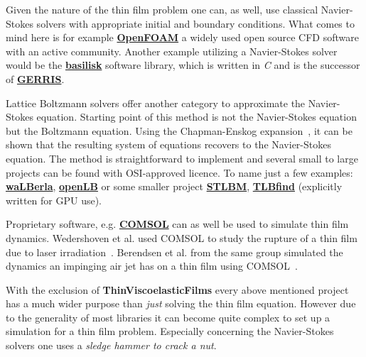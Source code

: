 Given the nature of the thin film problem one can, as well, use classical Navier-Stokes solvers with appropriate initial and boundary conditions.
What comes to mind here is for example \href{https://www.openfoam.com/}{\textbf{OpenFOAM}} a widely used open source CFD software with an active community.
Another example utilizing a Navier-Stokes solver would be the \href{http://basilisk.fr}{\textbf{basilisk}} software library, which is written in \textit{C} and is the successor of \href{http://gfs.sourceforge.net/wiki/index.php/Main_Page}{\textbf{GERRIS}}.

Lattice Boltzmann solvers offer another category to approximate the Navier-Stokes equation.
Starting point of this method is not the Navier-Stokes equation but the Boltzmann equation.
Using the Chapman-Enskog expansion~\cite{chapmanMathematicalTheoryNonuniform1990, enskogKinetischeTheorieVorgange1917}, it can be shown that the resulting system of equations recovers to the Navier-Stokes equation.
The method is straightforward to implement and several small to large projects can be found with OSI-approved licence. 
To name just a few examples: \href{https://walberla.net/doxygen/index.html}{\textbf{waLBerla}}, \href{https://www.openlb.net/}{\textbf{openLB}} or some smaller project \href{https://gitlab.com/unigehpfs/stlbm}{\textbf{STLBM}}, \href{https://github.com/FrancescaPelusi/TLBfind}{\textbf{TLBfind}} (explicitly written for GPU use).

Proprietary software, e.g. \href{https://www.comsol.com/}{\textbf{COMSOL}} can as well be used to simulate thin film dynamics.
Wedershoven et al. used COMSOL to study the rupture of a thin film due to laser irradiation~\cite{wedershovenInfraredLaserInduced2014}.
Berendsen et al. from the same group simulated the dynamics an impinging air jet has on a thin film using COMSOL~\cite{berendsenRuptureThinLiquid2012}.

With the exclusion of \textbf{ThinViscoelasticFilms} every above mentioned project has a much wider purpose than \textit{just} solving the thin film equation.
However due to the generality of most libraries it can become quite complex to set up a simulation for a thin film problem.
Especially concerning the Navier-Stokes solvers one uses a \textit{sledge hammer to crack a nut}.

